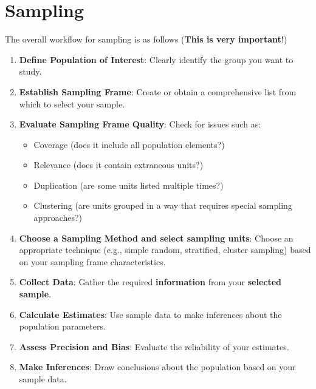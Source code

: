 \documentclass[math,code]{amznotes}
\theoremstyle{remark}
\begin{document}
\section{Sampling}
The overall workflow for sampling is as follows (\textbf{This is very important}!)
\begin{enumerate}
    \item \textbf{Define Population of Interest}: Clearly identify the group you want to study.
    \item \textbf{Establish Sampling Frame}: Create or obtain a comprehensive list from which to select your sample.
    \item \textbf{Evaluate Sampling Frame Quality}: Check for issues such as:
    \begin{itemize}
        \item Coverage (does it include all population elements?)
        \item Relevance (does it contain extraneous units?)
        \item Duplication (are some units listed multiple times?)
        \item Clustering (are units grouped in a way that requires special sampling approaches?)
    \end{itemize}
    \item \textbf{Choose a Sampling Method and select sampling units}: Choose an appropriate technique (e.g., simple random, stratified, cluster sampling) based on your sampling frame characteristics.
    \item \textbf{Collect Data}: Gather the required \textbf{information} from your \textbf{selected sample}.
    \item \textbf{Calculate Estimates}: Use sample data to make inferences about the population parameters.
    \item \textbf{Assess Precision and Bias}: Evaluate the reliability of your estimates.
    \item \textbf{Make Inferences}: Draw conclusions about the population based on your sample data.
\end{enumerate}
\end{document}
